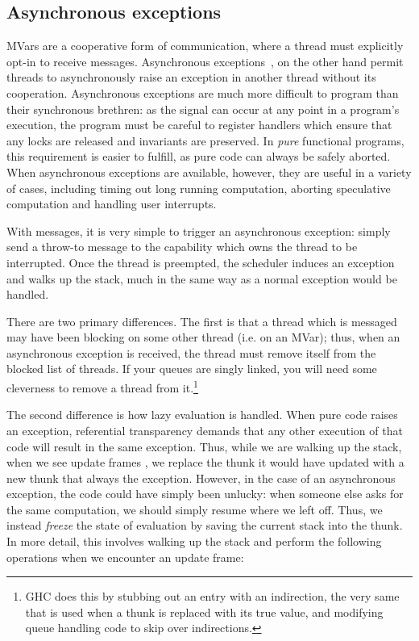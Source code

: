 \subsection{Asynchronous exceptions}

MVars are a cooperative form of communication, where a thread must
explicitly opt-in to receive messages.  Asynchronous
exceptions~\cite{Marlow:2001:AEH:378795.378858}, on the other hand
permit threads to asynchronously raise an exception in another thread
without its cooperation.  Asynchronous exceptions are much more
difficult to program than their synchronous brethren: as the signal can
occur at any point in a program's execution, the program must be careful
to register handlers which ensure that any locks are released and
invariants are preserved.  In \emph{pure} functional programs, this requirement
is easier to fulfill, as pure code can always be safely aborted.  When
asynchronous exceptions are available, however, they are useful
in a variety of cases, including timing out long running computation,
aborting speculative computation and handling user interrupts.

With messages, it is very simple to trigger an asynchronous exception:
simply send a throw-to message to the capability which owns the thread
to be interrupted.  Once the thread is preempted, the scheduler induces
an exception and walks up the stack, much in the same way as a normal
exception would be handled.

There are two primary differences.  The first is that a thread which is
messaged may have been blocking on some other thread (i.e. on an MVar);
thus, when an asynchronous exception is received, the thread must remove
itself from the blocked list of threads.  If your queues are singly
linked, you will need some cleverness to remove a thread from
it.\footnote{GHC does this by stubbing out an entry with an indirection,
    the very same that is used when a thunk is replaced with its true
value, and modifying queue handling code to skip over indirections.}

The second difference is how lazy evaluation is handled. When pure code
raises an exception, referential transparency demands that any other
execution of that code will result in the same exception.  Thus, while
we are walking up the stack, when we see update frames ,
we replace the thunk it would have updated with a new thunk that always
the exception.  However, in the case of an asynchronous exception, the
code could have simply been unlucky: when someone else asks for the same
computation, we should simply resume where we left off.  Thus, we
instead \emph{freeze} the state of evaluation by saving the current
stack into the thunk.~\cite{Reid1999}  In more detail, this involves walking up the stack
and perform the following operations when we encounter an update frame:

